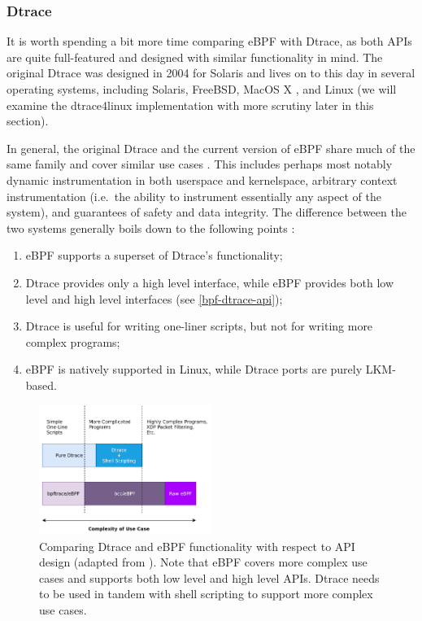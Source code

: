 \documentclass[
  12pt]{findlay}
\providecommand{\tightlist}{\setlength{\itemsep}{0pt}\setlength{\parskip}{0pt}}
\begin{document}
\hypertarget{dtrace}{%
\subsubsection{Dtrace}\label{dtrace}}

It is worth spending a bit more time comparing eBPF with Dtrace, as both
APIs are quite full-featured and designed with similar functionality in
mind. The original Dtrace \autocite{cantrill04} was designed in 2004 for
Solaris and lives on to this day in several operating systems, including
Solaris, FreeBSD, MacOS X \autocite{gregg14}, and Linux
\autocite{dtrace4linux} (we will examine the dtrace4linux implementation
with more scrutiny later in this section).

In general, the original Dtrace and the current version of eBPF share
much of the same family and cover similar use cases
\autocite{cantrill04,starovoitov13,starovoitov14}. This includes perhaps
most notably dynamic instrumentation in both userspace and kernelspace,
arbitrary context instrumentation (i.e.~the ability to instrument
essentially any aspect of the system), and guarantees of safety and data
integrity. The difference between the two systems generally boils down
to the following points \autocite{gregg14,gregg19bpf}:

\begin{enumerate}
\def\labelenumi{\arabic{enumi})}
\tightlist
\item
  eBPF supports a superset of Dtrace's functionality;
\item
  Dtrace provides only a high level interface, while eBPF provides both
  low level and high level interfaces (see \autoref{bpf-dtrace-api});
\item
  Dtrace is useful for writing one-liner scripts, but not for writing
  more complex programs;
\item
  eBPF is natively supported in Linux, while Dtrace ports are purely
  LKM-based.
\end{enumerate}

\begin{figure}
\includegraphics[width=0.5\textwidth]{../figures/bpf-dtrace-api.png}
\caption[Comparing Dtrace and eBPF functionality with respect to API design]
{
Comparing Dtrace and eBPF functionality with respect to API design (adapted from \cite{gregg18}).
Note that eBPF covers more complex use cases and supports both low level
and high level APIs. Dtrace needs to be used in tandem with shell
scripting to support more complex use cases.
}
\label{bpf-dtrace-api}
\end{figure}
\end{document}
